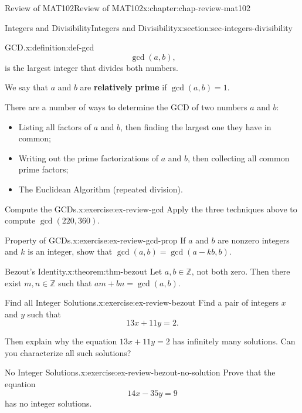 \documentclass[oneside,10pt,]{book}
\newcommand{\terminology}[1]{\textbf{#1}}
\numberwithin{equation}{section}
\begin{document}
\begin{chapterptx}{Review of MAT102}{}{Review of MAT102}{}{}{x:chapter:chap-review-mat102}
\begin{sectionptx}{Integers and Divisibility}{}{Integers and Divisibility}{}{}{x:section:sec-integers-divisibility}
\begin{definition}{GCD.}{x:definition:def-gcd}
\begin{equation*}
\gcd(a,b)\text{,}
\end{equation*}
is the largest integer that divides both numbers.%
\par
We say that \(a\) and \(b\) are \terminology{relatively prime} if \(\gcd(a,b) = 1\).%
\end{definition}
There are a number of ways to determine the GCD of two numbers \(a\) and \(b\):%
\begin{itemize}[label=\textbullet]
\item{}Listing all factors of \(a\) and \(b\), then finding the largest one they have in common;%
\item{}Writing out the prime factorizations of \(a\) and \(b\), then collecting all common prime factors;%
\item{}The Euclidean Algorithm (repeated division).%
\end{itemize}
%
\begin{inlineexercise}{Compute the GCDs.}{x:exercise:ex-review-gcd}%
Apply the three techniques above to compute \(\gcd(220,360)\).%
\end{inlineexercise}%
\begin{inlineexercise}{Property of GCDs.}{x:exercise:ex-review-gcd-prop}%
If \(a\) and \(b\) are nonzero integers and \(k\) is an integer, show that \(\gcd(a,b) = \gcd(a-kb,b)\).%
\end{inlineexercise}%
\begin{theorem}{Bezout's Identity.}{}{x:theorem:thm-bezout}%
Let \(a,b \in \mathbb{Z}\), not both zero. Then there exist \(m,n \in \mathbb{Z}\) such that \(am + bn = \gcd(a,b)\).%
\end{theorem}
\begin{inlineexercise}{Find all Integer Solutions.}{x:exercise:ex-review-bezout}%
Find a pair of integers \(x\) and \(y\) such that%
\begin{equation*}
13x + 11y = 2\text{.}
\end{equation*}
%
\par
Then explain why the equation \(13x + 11y = 2\) has infinitely many solutions. Can you characterize all such solutions?%
\end{inlineexercise}%
\begin{inlineexercise}{No Integer Solutions.}{x:exercise:ex-review-bezout-no-solution}%
Prove that the equation%
\begin{equation*}
14x - 35y = 9
\end{equation*}
has no integer solutions.%
\end{inlineexercise}%

\end{sectionptx}
\end{chapterptx}
\end{document}
